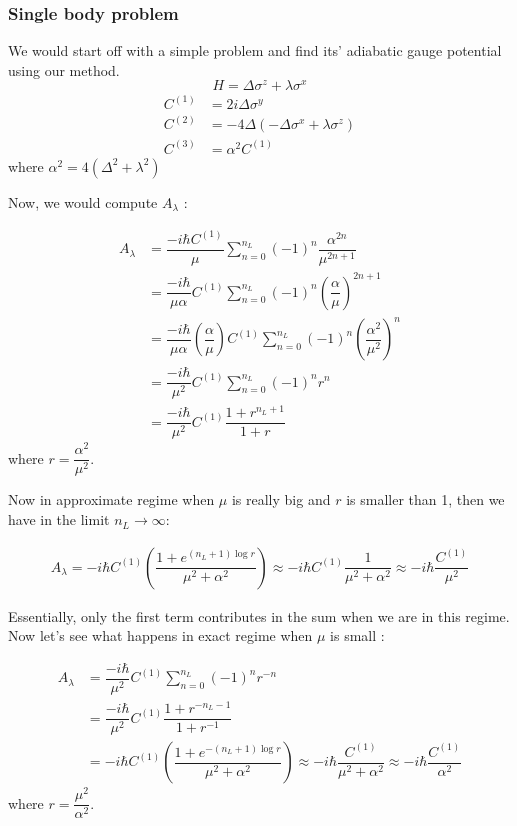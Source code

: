 \documentclass[11pt,a4paper]{article}
\begin{document}
\subsubsection{Single body problem}

We would start off with a simple problem and find its' adiabatic gauge potential using our method.
\begin{equation}
H= \Delta \sigma^z + \lambda \sigma^x
\end{equation}
\begin{align}
C^{(1)} &= 2 i \Delta \sigma^y \\
C^{(2)} &= - 4  \Delta ( -  \Delta \sigma^x + \lambda \sigma^z) \\
C^{(3)} &= \alpha^2 C^{(1)} 
\end{align}
where $\alpha^2 = 4 (\Delta^2 + \lambda^2) $


Now, we would compute $A_{\lambda}$ :

\begin{align*}
A_{\lambda} &=  \dfrac{-i \hbar   C^{(1)}}{\mu}\sum_{n=0}^{n_L}   (-1)^{n} \dfrac{ \alpha^{2n}}{\mu^{2n+1}} \\
&=  \dfrac{-i \hbar }{\mu \alpha}  C^{(1)}\sum_{n=0}^{n_L}   (-1)^{n} \left(\dfrac{ \alpha}{\mu} \right)^{2n+1} \\
&=  \dfrac{-i \hbar }{\mu \alpha} \left(\dfrac{ \alpha}{\mu} \right)  C^{(1)}\sum_{n=0}^{n_L}  (-1)^{n}  \left(\dfrac{ \alpha^2}{\mu^2} \right)^{n} \\
&=  \dfrac{-i \hbar }{\mu^2}   C^{(1)}\sum_{n=0}^{n_L}  (-1)^{n}  r^{n} \\
&=  \dfrac{-i \hbar }{\mu^2}  C^{(1)} \dfrac{1+ r^{n_L+1}}{ 1+r}
\end{align*}
where $r=\dfrac{ \alpha^2}{\mu^2}$. 

Now in approximate regime when $\mu$ is really big and $r$ is smaller than 1, then we have in the limit 
$n_L \rightarrow \infty$:

\begin{align*}
A_{\lambda}  =  -i \hbar  C^{(1)} \left( \dfrac{1 + e^{ (n_L+1) \log r  }}{ \mu^2 + \alpha^2}\right) \approx -i \hbar  C^{(1)}  \dfrac{1 }{ \mu^2 + \alpha^2} \approx -i \hbar    \dfrac{C^{(1)} }{ \mu^2}
\end{align*}

Essentially, only the first term contributes in the sum when we are in this regime. Now let's see what happens in exact regime when $\mu$ is small :

\begin{align*}
A_{\lambda} &=  \dfrac{-i \hbar }{\mu^2}  C^{(1)}\sum_{n=0}^{n_L}  (-1)^{n}  r^{-n}\\
& =  \dfrac{-i \hbar }{\mu^2}  C^{(1)} \dfrac{1+ r^{-n_L-1}}{ 1+r^{-1}}\\
& =-i \hbar  C^{(1)} \left( \dfrac{1 + e^{ -(n_L+1) \log r  }}{ \mu^2 + \alpha^2}\right)  \approx -i \hbar    \dfrac{C^{(1)} }{\mu^2 + \alpha^2} \approx -i \hbar    \dfrac{C^{(1)} }{ \alpha^2}
\end{align*}
where $r=\dfrac{\mu^2} { \alpha^2}$. 
\end{document}

